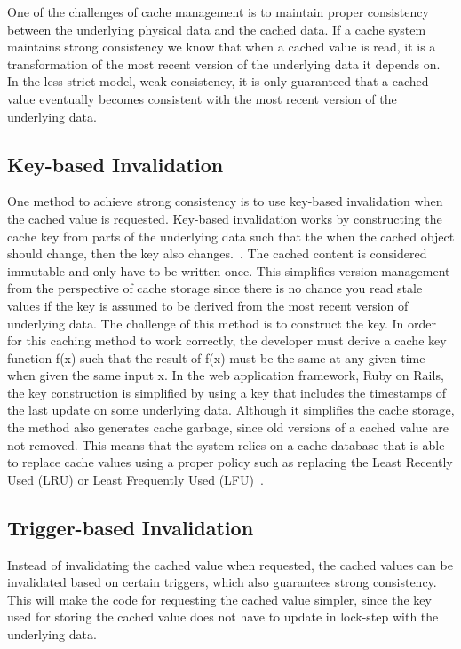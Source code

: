 One of the challenges of cache management is to maintain proper consistency between the underlying physical data and the cached data. If a cache system maintains strong consistency we know that when a cached value is read, it is a transformation of the most recent version of the underlying data it depends on. In the less strict model, weak consistency, it is only guaranteed that a cached value eventually becomes consistent with the most recent version of the underlying data.

\subsection{Key-based Invalidation}

One method to achieve strong consistency is to use key-based invalidation when the cached value is requested. Key-based invalidation works by constructing the cache key from parts of the underlying data such that the when the cached object should change, then the key also changes.~\cite{blog:key-based-invalidation}. The cached content is considered immutable and only have to be written once. This simplifies version management from the perspective of cache storage since there is no chance you read stale values if the key is assumed to be derived from the most recent version of underlying data. The challenge of this method is to construct the key. In order for this caching method to work correctly, the developer must derive a cache key function f(x) such that the result of f(x) must be the same at any given time when given the same input x. In the web application framework, Ruby on Rails, the key construction is simplified by using a key that includes the timestamps of the last update on some underlying data. Although it simplifies the cache storage, the method also generates cache garbage, since old versions of a cached value are not removed. This means that the system relies on a cache database that is able to replace cache values using a proper policy such as replacing the Least Recently Used (LRU) or Least Frequently Used (LFU)~\cite{paper:web-caching-schemes}.

\subsection{Trigger-based Invalidation}

Instead of invalidating the cached value when requested, the cached values can be invalidated based on certain triggers, which also guarantees strong consistency. This will make the code for requesting the cached value simpler, since the key used for storing the cached value does not have to update in lock-step with the underlying data.

